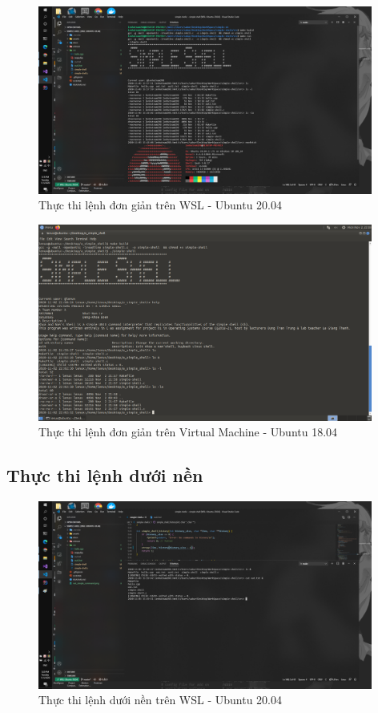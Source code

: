 \documentclass{article}
\begin{document}
\begin{figure}[H]
\centering
\includegraphics[width=0.98\textwidth]{wsl_simple_command.png}
\caption{Thực thi lệnh đơn giản trên WSL - Ubuntu 20.04}
\end{figure}

\begin{figure}[H]
\centering
\includegraphics[width=0.98\textwidth]{virtual_machine_executing_command_in_child_process.png}
\caption{Thực thi lệnh đơn giản trên Virtual Machine - Ubuntu 18.04}
\end{figure}

\subsection{Thực thi lệnh dưới nền}

\begin{figure}[H]
\centering
\includegraphics[width=0.98\textwidth]{wsl_simple_command_background.png}
\caption{Thực thi lệnh dưới nền trên WSL - Ubuntu 20.04}
\end{figure}
\end{document}

